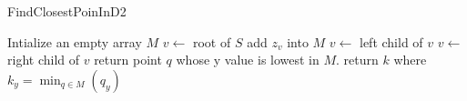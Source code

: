 \documentclass[12pt]{article}
\begin{document}
\begin{algorithm}[h]
  \caption{FindClosestPoinInD2}
  \begin{algorithmic}
    \State Intialize an empty array $M$
    \State $v \leftarrow$ root of $S$
            \State add $z_v$ into $M$
            \State $v \leftarrow$ left child of $v$
        \Else
            \State $v \leftarrow$ right child of $v$
        \EndIf
    \EndWhile
    \State return point $q$ whose y value is lowest in $M$.
    \State return $k$ where $k_y = \min_{q \in M} (q_y)$
  \end{algorithmic}
\end{algorithm}

%
%
%
%
%
%
\end{document}
